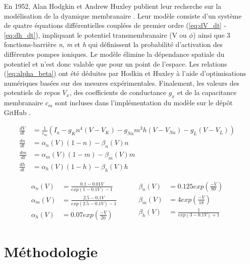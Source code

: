 \documentclass{article}
\begin{document}
En 1952, Alan Hodgkin et Andrew Huxley publient leur recherche sur la modélisation de la dyamique membranaire \cite{hodgkin_huxley}. Leur modèle consiste d'un système de quatre équations différentielles couplées de premier ordre (\ref{eq:dV_dt} - \ref{eq:dh_dt}), impliquant le potentiel transmembranaire (V ou $\phi$) ainsi que 3 fonctions-barrière \textit{n}, \textit{m} et \textit{h} qui définissent la probabilité d'activation des différentes pompes ioniques. Le modèle élimine la dépendance spatiale du potentiel et n'est donc valable que pour un point de l'espace. Les relations (\ref{eq:alpha_beta}) ont été déduites par Hodkin et Huxley à l'aide d'optimisations numériques basées sur des mesures expérimentales. Finalement, les valeurs des potentiels de repos $V_x$, des coefficients de conductance $g_x$ et de la capacitance membranaire $c_m$ sont incluses dans l'implémentation du modèle sur le dépôt GitHub \cite{github}.

\begin{align}
	\label{eq:dV_dt}
	\frac{dV}{dt} & = \frac{1}{c_m}( I_a - g_Kn^4(V - V_K) - g_{Na}m^3h(V - V_{Na}) - g_L(V - V_L)      )\\
	\label{eq:dn_dt}
 	\frac{dn}{dt} & = \alpha_n(V)(1-n) - \beta_n(V)n\\
 	\label{eq:dm_dt}
	\frac{dm}{dt} & = \alpha_m(V)(1-m) - \beta_m(V)m\\
	\label{eq:dh_dt}
	\frac{dh}{dt} & = \alpha_h(V)(1-h) - \beta_h(V)h
\end{align}

\begin{equation}
\begin{split}
\alpha_n (V) &= \frac{0.1-0.01V}{exp(1-0.1V) - 1}\\
\alpha_m (V) &= \frac{2.5-0.1V}{exp(2.5-0.1V) - 1}\\
\alpha_h (V) &= 0.07 exp(\frac{-V}{20})
\end{split}
\hspace{1cm}
\begin{split}
\beta_n (V) &= 0.125exp(\frac{-V}{80})\\
\beta_m (V) &= 4exp(\frac{-V}{18})\\
\beta_h (V) &= \frac{1}{exp(3-0.1V)+1}\\
\end{split}
\label{eq:alpha_beta}
\end{equation}

\section{Méthodologie}\label{sec:methodologie}
\end{document}

